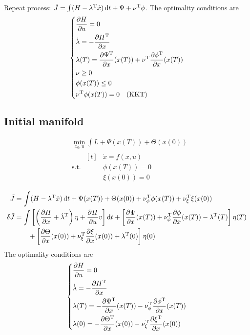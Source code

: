 Repeat process: $\tilde J = \int(H-\lambda^\text{T}\dot x)\mathop{}\!\mathrm{d} t + \Psi + \nu^\text{T}\phi$. The optimality conditions are
\[
  \begin{dcases}
    \frac{\partial H}{\partial u} = 0 \\
    \dot\lambda = -\frac{\partial H^\text{T}}{\partial x} \\
    \lambda(T) = \frac{\partial \Psi^\text{T}}{\partial x}(x(T)) + \nu^\text{T}\frac{\partial \phi^\text{T}}{\partial x}(x(T)) \\
    \nu \ge 0 \\
    \phi(x(T)) \le 0 \\
    \nu^\text{T} \phi(x(T)) = 0 \quad (\text{KKT})
  \end{dcases}
\]

\subsection{Initial manifold}
\begin{align}
  & \min_{x_0,u} \int L + \Psi(x(T)) + \Theta(x(0)) \\
  & \text{s.t. } \begin{aligned}[t]
    & \dot x = f(x,u) \\
    & \phi(x(T)) = 0 \\
    & \xi(x(0)) = 0
  \end{aligned}
\end{align}

\begin{align}
  \tilde J &= \int (H-\lambda^\text{T}\dot x)\mathop{}\!\mathrm{d} t + \Psi(x(T)) + \Theta(x(0)) + \nu^\text{T}_\phi \phi(x(T)) + \nu^\text{T}_\xi \xi(x(0)) \\
  \delta \tilde J &= \int \left[ \left( \frac{\partial H}{\partial x} + \dot\lambda^\text{T} \right) \eta + \frac{\partial H}{\partial u}v\right] \mathop{}\!\mathrm{d} t + \left[ \frac{\partial \Psi}{\partial x}(x(T)) + \nu^\text{T}_\phi \frac{\partial \phi}{\partial x}(x(T)) - \lambda^\text{T}(T) \right] \eta(T) \\
           & \qquad + \left[ \frac{\partial \Theta}{\partial x}(x(0)) + \nu^\text{T}_\xi \frac{\partial \xi}{\partial x}(x(0)) + \lambda^\text{T}(0) \right] \eta(0)
\end{align}
The optimality conditions are
\[
  \begin{dcases}
    \frac{\partial H}{\partial u} = 0 \\
    \dot\lambda = -\frac{\partial H^\text{T}}{\partial x} \\
    \lambda(T) = -\frac{\partial \Psi^\text{T}}{\partial x}(x(T)) - \nu^\text{T}_\phi \frac{\partial \phi^\text{T}}{\partial x}(x(T)) \\
    \lambda(0) = -\frac{\partial \Theta^\text{T}}{\partial x}(x(0)) - \nu^\text{T}_\xi \frac{\partial \xi^\text{T}}{\partial x}(x(0))
  \end{dcases}
\]

